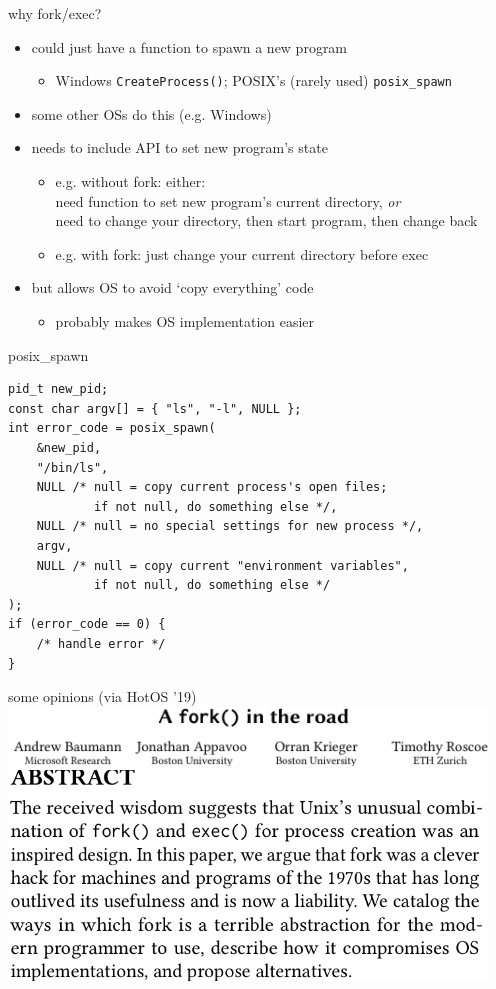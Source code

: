 \begin{frame}{why fork/exec?}
    \begin{itemize}
    \item could just have a function to spawn a new program
        \begin{itemize}
        \item Windows \texttt{CreateProcess()}; POSIX's (rarely used) \texttt{posix\_spawn}
        \end{itemize}
    \vspace{.5cm}
    \item some other OSs do this (e.g. Windows)
    \item needs to include API to set new program's state
        \begin{itemize}
        \item e.g. without fork: either: \\
        need function to set new program's current directory, \textit{or} \\
        need to change your directory, then start program, then change back
        \item e.g. with fork: just change your current directory before exec
        \end{itemize}
    \item but allows OS to avoid `copy everything' code
        \begin{itemize}
        \item probably makes OS implementation easier
        \end{itemize}
    \end{itemize}
\end{frame}

\begin{frame}[fragile,label=posixSpawn]{posix\_spawn}
\begin{lstlisting}[style=small]
pid_t new_pid;
const char argv[] = { "ls", "-l", NULL };
int error_code = posix_spawn(
    &new_pid,
    "/bin/ls",
    NULL /* null = copy current process's open files;
            if not null, do something else */,
    NULL /* null = no special settings for new process */,
    argv,
    NULL /* null = copy current "environment variables", 
            if not null, do something else */
);
if (error_code == 0) {
    /* handle error */
}
\end{lstlisting}
\end{frame}

\begin{frame}{some opinions (via HotOS '19)}
\includegraphics[width=5in]{../unix-api/fork-in-road-title}
\includegraphics[width=5in]{../unix-api/fork-in-road-abs}
\end{frame}

